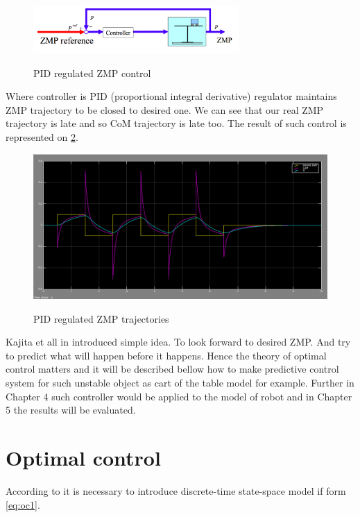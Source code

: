 \documentclass[12pt,a4paper]{report}
\begin{document}
		\begin{figure}[h!]
			\vspace{-0.2cm}
			\centering
			{\includegraphics[width=0.7\textwidth]{9}}
			\caption{PID regulated ZMP control \cite{kajita2003biped}}
			\label{fig:9}
			\vspace{-0.1cm}
		\end{figure}
		Where controller is PID (proportional integral derivative) regulator maintains ZMP trajectory to be closed to desired one. We can see that our real ZMP trajectory is late and so CoM trajectory is late too. The result of such control is represented on \cref{fig:10}.
		\begin{figure}[h!]
			\vspace{-0.2cm}
			\centering
			{\includegraphics[width=1\textwidth]{10}}
			\caption{PID regulated ZMP trajectories}
			\label{fig:10}
			\vspace{-0.1cm}
		\end{figure}
		Kajita et all in \cite{kajita2003biped} introduced simple idea. To look forward to desired ZMP. And try to predict what will happen before it happens. Hence the theory of optimal control matters and it will be described bellow how to make predictive control system for such unstable object as cart of the table model for example. Further in Chapter 4 such controller would be applied to the model of robot and in Chapter 5 the results will be evaluated.
		
		\section{Optimal control}
			According to \cite{hazell2008discrete} it is necessary to introduce discrete-time state-space model if form \ref{eq:oc1}.
			
\end{document}
